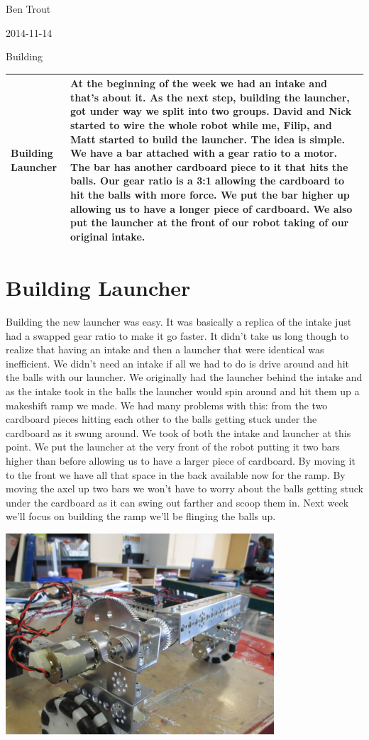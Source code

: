 Ben Trout

2014-11-14

Building

\begin{tabular}{|p{5cm}|p{5cm}|}
\hline
Building Launcher&
At the beginning of the week we had an intake and that’s about it. As the next step, building the launcher, got under way we split into two groups. David and Nick started to wire the whole robot while me, Filip, and Matt started to build the launcher. The idea is simple. We have a bar attached with a gear ratio to a motor. The bar has another cardboard piece to it that hits the balls. Our gear ratio is a 3:1 allowing the cardboard to hit the balls with more force. We put the bar higher up allowing us to have a longer piece of cardboard. We also put the launcher at the front of our robot taking of our original intake. 
\\
\hline
\end{tabular}

\section*{Building Launcher}
Building the new launcher was easy. It was basically a replica of the intake just had a swapped gear ratio to make it go faster. It didn’t take us long though to realize that having an intake and then a launcher that were identical was inefficient. We didn’t need an intake if all we had to do is drive around and hit the balls with our launcher. We originally had the launcher behind the intake and as the intake took in the balls the launcher would spin around and hit them up a makeshift ramp we made. We had many problems with this: from the two cardboard pieces hitting each other to the balls getting stuck under the cardboard as it swung around. We took of both the intake and launcher at this point. We put the launcher at the very front of the robot putting it two bars higher than before allowing us to have a larger piece of cardboard. By moving it to the front we have all that space in the back available now for the ramp. By moving the axel up two bars we won’t have to worry about the balls getting stuck under the cardboard as it can swing out farther and scoop them in. Next week we’ll focus on building the ramp we’ll be flinging the balls up. 

\begin{center}
\includegraphics[width=10cm]{./Entries/Images/LauncherInFront.jpg}
\end{center}
